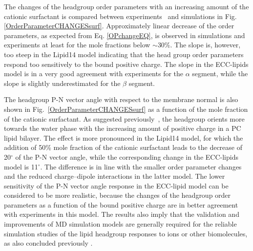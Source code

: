 \documentclass[aip,jcp,twocolumn]{revtex4}
\begin{document}
The changes of the headgroup order parameters with an increasing amount of 
the cationic surfactant is compared between experiments~\cite{scherer89} and
simulations in Fig. \ref{OrderParameterCHANGESsurf}.
Approximately linear decrease of the order parameters, as expected from Eq. \ref{OPchangeEQ},
is observed in simulations and experiments at least for the mole fractions
below $\sim$30\%. The slope is, however, too steep in the Lipid14 model indicating that 
the head group order parameters respond too sensitively to the bound positive charge.
The slope in the ECC-lipids model is in a very good agreement with experiments
for the $\alpha$ segment, while the slope is slightly
underestimated for the $\beta$ segment.

The headgroup P-N vector angle with respect to the membrane normal
is also shown in Fig.~\ref{OrderParameterCHANGESsurf}
as a function of the mole fraction of the cationic surfactant.
As suggested previously~\cite{seelig87}, the headgroup orients
more towards the water phase with the increasing amount of positive
charge in a PC lipid bilayer. The effect is more pronounced in the
Lipid14 model, for which the addition of 50\% mole fraction of the cationic
surfactant leads to the decrease of 20$^{\circ}$ of the P-N vector angle,
while the corresponding change in the ECC-lipids model is 11$^{\circ}$.
The difference is in line with the smaller order parameter 
changes and the reduced charge--dipole interactions in the latter model.
The lower sensitivity of the P-N vector angle response in the ECC-lipid
model can be considered to be more realistic, because the changes of the headgroup
order parameters as a function of the bound positive charge
are in better agreement with experiments in this model.
The results also imply that the validation and improvements of MD simulation
models are generally required for the reliable simulation studies of the
lipid headgroup responses to ions or other biomolecules, as also concluded
previously \cite{botan15}.


%
%
\end{document}
